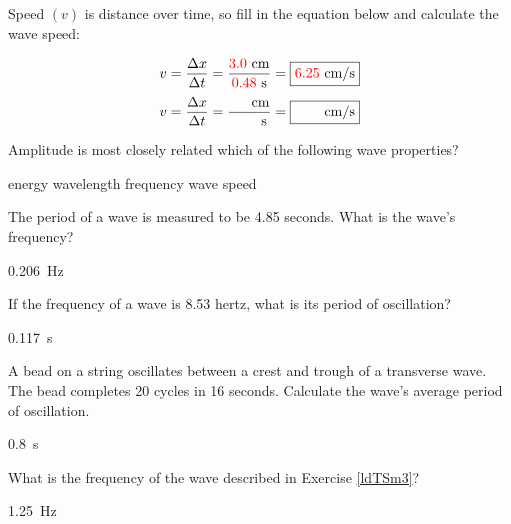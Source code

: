 \documentclass[../main-physics-problems.tex]{subfiles}
\begin{document}
\begin{questions}
\begin{parts}
Speed $(v)$ is distance over time, so fill in the equation below and calculate the wave speed:

\ifprintanswers
\bgroup
\large 
\begin{equation*}
    v = \frac{\Delta x}{\Delta t} = \frac{\textcolor{red}{3.0}\ \mathrm{cm}}{\textcolor{red}{0.48}\ \mathrm{s}} = \boxed{\textcolor{red}{6.25}\ \mathrm{cm/s}}
\end{equation*}
\egroup
\else
\bgroup
\large 
\begin{equation*}
    v = \frac{\Delta x}{\Delta t} = \frac{\textcolor{white}{3.0}\ \mathrm{cm}}{\textcolor{white}{0.48}\ \mathrm{s}} = \boxed{\textcolor{white}{6.25}\ \mathrm{cm/s}}
\end{equation*}
\egroup
\fi
\end{parts}

\question
Amplitude is most closely related which of the following wave properties?

\begin{randomizechoices}
    \correctchoice energy
    \choice wavelength
    \choice frequency
    \choice wave speed
\end{randomizechoices}

\question \label{XGViXs}
The period of a wave is measured to be 4.85 seconds. What is the wave's frequency?


\begin{solution}
\SI{0.206}{Hz}
\end{solution}




\question \label{EeHAB4} 
If the frequency of a wave is 8.53 hertz, what is its period of oscillation?


\begin{solution}
\SI{0.117}{s}
\end{solution}

\question \label{ldTSm3} 
A bead on a string oscillates between a crest and trough of a transverse wave. The bead completes 20 cycles in 16 seconds. Calculate the wave's average period of oscillation. 


\begin{solution}
\SI{0.8}{s}
\end{solution}

\question \label{3rLSIq}
What is the frequency of the wave described in Exercise \ref{ldTSm3}?


\begin{solution}
\SI{1.25}{Hz}
\end{solution}


\end{questions}
\end{document}
